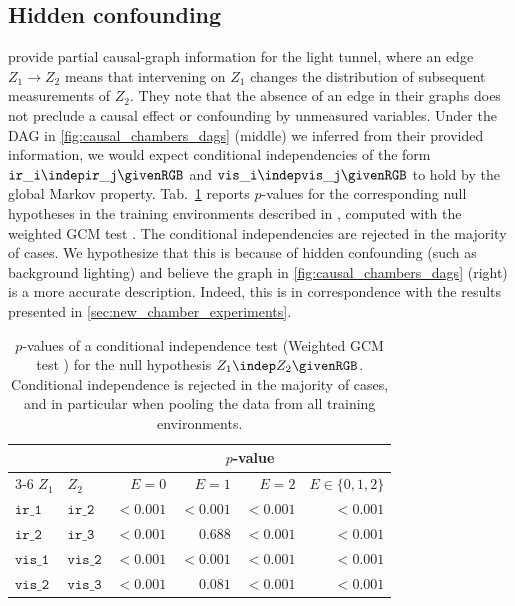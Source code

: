 \subsection{Hidden confounding} \label{app:hidden_confounding}
\citet{gamellaCausalChambersRealworld2025} provide partial causal-graph
information for the light tunnel, where an edge $Z_1 \to Z_2$ means that
intervening on $Z_1$ changes the distribution of subsequent measurements of $Z_2$.
They note that the absence of an edge in their graphs does not preclude a
causal effect or confounding by unmeasured variables.
Under the DAG in \cref{fig:causal_chambers_dags} (middle) we inferred from their provided information, we would expect conditional independencies of the form $\mathtt{ir\_i} \indep \mathtt{ir\_j} \given \mathtt{RGB}$ and $\mathtt{vis\_i} \indep \mathtt{vis\_j} \given \mathtt{RGB}$ to hold by the global Markov property. Tab.~\ref{tab:hidden_conf} reports $p$-values for the corresponding null hypotheses in the training environments described in , computed with the weighted GCM test \citep{scheideggerWeightedGeneralisedCovariance2022}. The conditional independencies are rejected in the majority of cases.
We hypothesize that this is because of hidden confounding (such as background lighting) and believe the graph in \cref{fig:causal_chambers_dags} (right) is a more accurate description. Indeed, this is in correspondence with the results presented in \cref{sec:new_chamber_experiments}.
\begin{table}[t]
    \centering
    \caption{%
      $p$-values of a conditional independence test (Weighted GCM test \citep{scheideggerWeightedGeneralisedCovariance2022}) for the null hypothesis $Z_1 \indep Z_2 \given \mathtt{RGB}$. Conditional independence is rejected in the majority of cases, and in particular when pooling the data from all training environments. %
    }
    \label{tab:hidden_conf}
    \small
\begin{tabular}{llrrrr}
\toprule
 & & \multicolumn{4}{c}{$p$-value} \\
\cmidrule(lr){3-6}
$Z_1$ & $Z_2$ & $E=0$ & $E=1$ & $E=2$ & $E \in \{0,1,2\}$ \\
\midrule
$\mathtt{ir\_1}$ & $\mathtt{ir\_2}$ & $<0.001$ & $<0.001$ & $<0.001$ & $<0.001$ \\
$\mathtt{ir\_2}$ & $\mathtt{ir\_3}$ & $<0.001$ & $0.688$ & $<0.001$ & $<0.001$ \\
$\mathtt{vis\_1}$ & $\mathtt{vis\_2}$ & $<0.001$ & $<0.001$ & $<0.001$ & $<0.001$ \\
$\mathtt{vis\_2}$ & $\mathtt{vis\_3}$ & $<0.001$ & $0.081$ & $<0.001$ & $<0.001$ \\
\bottomrule
\end{tabular}
\end{table}




